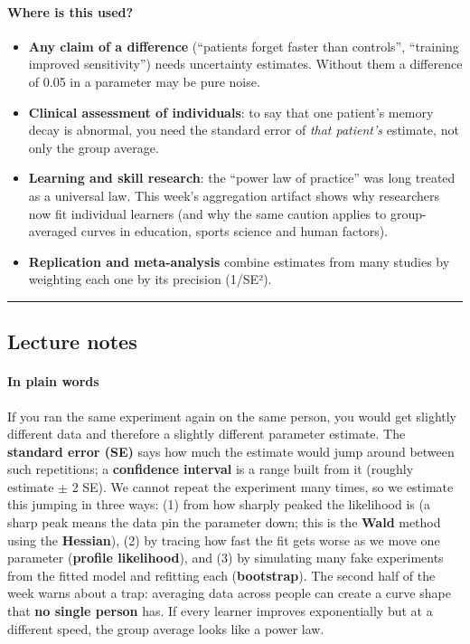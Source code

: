 \paragraph{Where is this used?}

\begin{itemize}
\tightlist
\item
  \textbf{Any claim of a difference} (``patients forget faster than
  controls'', ``training improved sensitivity'') needs uncertainty
  estimates. Without them a difference of 0.05 in a parameter may be
  pure noise.
\item
  \textbf{Clinical assessment of individuals}: to say that one patient's
  memory decay is abnormal, you need the standard error of \emph{that
  patient's} estimate, not only the group average.
\item
  \textbf{Learning and skill research}: the ``power law of practice''
  was long treated as a universal law. This week's aggregation artifact
  shows why researchers now fit individual learners (and why the same
  caution applies to group-averaged curves in education, sports science
  and human factors).
\item
  \textbf{Replication and meta-analysis} combine estimates from many
  studies by weighting each one by its precision (1/SE²).
\end{itemize}

\begin{center}\rule{0.5\linewidth}{0.5pt}\end{center}


\subsection{Lecture notes}

\paragraph{In plain words}

If you ran the same experiment again on the same person, you would get
slightly different data and therefore a slightly different parameter
estimate. The \textbf{standard error (SE)} says how much the estimate
would jump around between such repetitions; a \textbf{confidence
interval} is a range built from it (roughly estimate \ensuremath{\pm} 2 SE). We cannot
repeat the experiment many times, so we estimate this jumping in three
ways: (1) from how sharply peaked the likelihood is (a sharp peak means
the data pin the parameter down; this is the \textbf{Wald} method using
the \textbf{Hessian}), (2) by tracing how fast the fit gets worse as we
move one parameter (\textbf{profile likelihood}), and (3) by simulating
many fake experiments from the fitted model and refitting each
(\textbf{bootstrap}). The second half of the week warns about a trap:
averaging data across people can create a curve shape that \textbf{no
single person} has. If every learner improves exponentially but at a
different speed, the group average looks like a power law.

